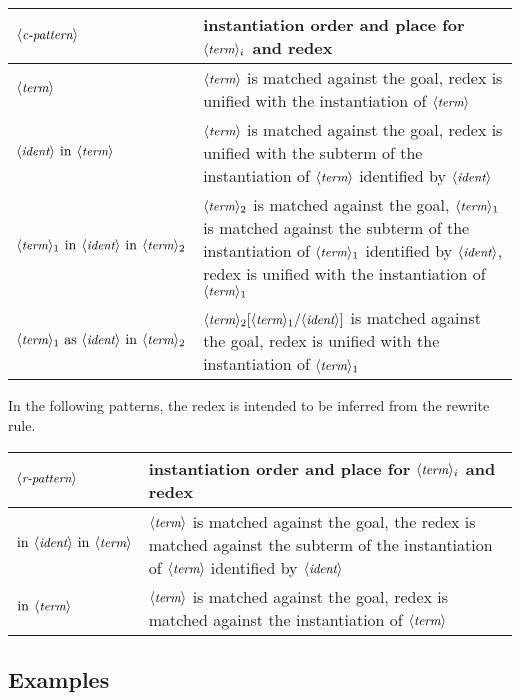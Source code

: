 \begin{center}
\begin{tabularx}{\textwidth}{>{\arraybackslash}m{}|>{\arraybackslash}m{}}
$\N{c-pattern}$ & instantiation order and place for $\N{term}_i$ and redex\\
\hline
$\N{term}$ & $\N{term}$ is matched against the goal, redex is unified with
    the instantiation of $\N{term}$\\
\hline
$\N{ident}\ \C{in}\ \N{term}$ &
    $\N{term}$ is matched against the goal, redex is
    unified with the subterm of the
    instantiation of $\N{term}$ identified by $\N{ident}$\\
\hline
$\N{term}_1\ \C{in}\ \N{ident}\ \C{in}\ \N{term}_2$ &
    $\N{term}_2$ is matched against the goal, $\N{term}_1$ is
    matched against the subterm of the
    instantiation of $\N{term}_1$ identified by $\N{ident}$,
    redex is unified with the instantiation of $\N{term}_1$\\
\hline
$\N{term}_1\ \C{as}\ \N{ident}\ \C{in}\ \N{term}_2$ &
    $\N{term}_2[\N{term}_1/\N{ident}]$
    is matched against the goal,
    redex is unified with the instantiation of $\N{term}_1$\\
\hline
\end{tabularx}
\end{center}

In the following patterns, the redex is intended to be inferred from the
rewrite rule.

\begin{center}
\begin{tabularx}{\textwidth}{>{\arraybackslash}m{}|>{\arraybackslash}m{}}
$\N{r-pattern}$ & instantiation order and place for $\N{term}_i$ and redex\\
\hline
$\C{in}\ \N{ident}\ \C{in}\ \N{term}$ &
    $\N{term}$ is matched against the goal, the redex is
    matched against the subterm of the
    instantiation of $\N{term}$ identified by $\N{ident}$\\
\hline
$\C{in}\ \N{term}$ & $\N{term}$ is matched against the goal, redex is
   matched against the instantiation of $\N{term}$\\
\hline
\end{tabularx}
\end{center}

\subsection{Examples}

